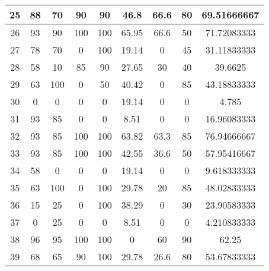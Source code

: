 \begin{table}[H]
\begin{tabular}{|c|c|c|c|c|c|c|c|c|}
25          & 88          & 70          & 90          & 90           & 46.8        & 66.6        & 80            & 69.51666667         \\ \hline
26          & 93          & 90          & 100         & 100          & 65.95       & 66.6        & 50            & 71.72083333         \\ \hline
27          & 78          & 70          & 0           & 100          & 19.14       & 0           & 45            & 31.11833333         \\ \hline
28          & 58          & 10          & 85          & 90           & 27.65       & 30          & 40            & 39.6625             \\ \hline
29          & 63          & 100         & 0           & 50           & 40.42       & 0           & 85            & 43.18833333         \\ \hline
30          & 0           & 0           & 0           & 0            & 19.14       & 0           & 0             & 4.785               \\ \hline
31          & 93          & 85          & 0           & 0            & 8.51        & 0           & 0             & 16.96083333         \\ \hline
32          & 93          & 85          & 100         & 100          & 63.82       & 63.3        & 85            & 76.94666667         \\ \hline
33          & 93          & 85          & 100         & 100          & 42.55       & 36.6        & 50            & 57.95416667         \\ \hline
34          & 58          & 0           & 0           & 0            & 19.14       & 0           & 0             & 9.618333333         \\ \hline
35          & 63          & 100         & 0           & 100          & 29.78       & 20          & 85            & 48.02833333         \\ \hline
36          & 15          & 25          & 0           & 100          & 38.29       & 0           & 30            & 23.90583333         \\ \hline
37          & 0           & 25          & 0           & 0            & 8.51        & 0           & 0             & 4.210833333         \\ \hline
38          & 96          & 95          & 100         & 100          & 0           & 60          & 90            & 62.25               \\ \hline
39          & 68          & 65          & 90          & 100          & 29.78       & 26.6        & 80            & 53.67833333         \\ \hline

\end{tabular}
\end{table}
